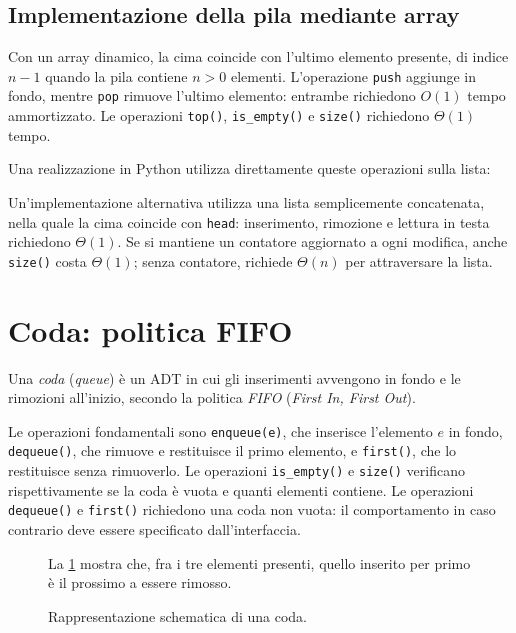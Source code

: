 \subsection{Implementazione della pila mediante array}
\label{sec:fi-adt-pila-implementazione-array}

Con un array dinamico, la cima coincide con l'ultimo elemento
presente, di indice \(n-1\) quando la pila contiene \(n>0\)
elementi. L'operazione \texttt{push} aggiunge in fondo, mentre
\texttt{pop} rimuove l'ultimo elemento: entrambe richiedono
\(O(1)\) tempo ammortizzato. Le operazioni \texttt{top()},
\texttt{is\_empty()} e \texttt{size()} richiedono \(\Theta(1)\)
tempo.

Una realizzazione in Python utilizza direttamente queste operazioni
sulla lista:



Un'implementazione alternativa utilizza una lista semplicemente
concatenata, nella quale la cima coincide con \texttt{head}:
inserimento, rimozione e lettura in testa richiedono
\(\Theta(1)\). Se si mantiene un contatore aggiornato a ogni
modifica, anche \texttt{size()} costa \(\Theta(1)\); senza
contatore, richiede \(\Theta(n)\) per attraversare la lista.

\section{Coda: politica FIFO}
\label{sec:fi-adt-coda}

\begin{definition}[Coda]
\label{def:fi-adt-coda}
Una \emph{coda} (\emph{queue}) è un ADT in cui gli inserimenti
avvengono in fondo e le rimozioni all'inizio, secondo la politica
\emph{FIFO} (\emph{First In, First Out}).
\end{definition}

Le operazioni fondamentali sono \texttt{enqueue(e)}, che inserisce
l'elemento \(e\) in fondo, \texttt{dequeue()}, che rimuove e
restituisce il primo elemento, e \texttt{first()}, che lo
restituisce senza rimuoverlo. Le operazioni \texttt{is\_empty()}
e \texttt{size()} verificano rispettivamente se la coda è vuota
e quanti elementi contiene. Le operazioni \texttt{dequeue()} e
\texttt{first()} richiedono una coda non vuota: il comportamento
in caso contrario deve essere specificato dall'interfaccia.

\begin{figure}[htbp]
  \begin{minipage}[c]{0.54\textwidth}
    La \cref{fig:fi-coda} mostra che, fra i tre elementi presenti,
    quello inserito per primo è il prossimo a essere rimosso.
  \end{minipage}
  \hfill
  \begin{minipage}[c]{0.40\textwidth}
    \centering
    \resizebox{\linewidth}{!}{%
    }
  \end{minipage}
  \caption{Rappresentazione schematica di una coda.}
  \label{fig:fi-coda}
\end{figure}

